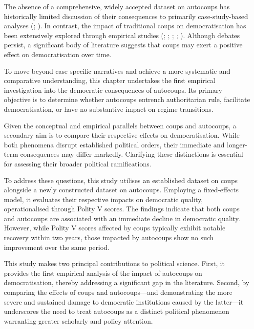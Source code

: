 \documentclass[
  12pt,
]{report}
\begin{document}
The absence of a comprehensive, widely accepted dataset on autocoups has
historically limited discussion of their consequences to primarily
case-study-based analyses (; ). In
contrast, the impact of traditional coups on democratisation has been
extensively explored through empirical studies
(; ; ; ;
). Although debates
persist, a significant body of literature suggests that coups may exert
a positive effect on democratisation over time.

To move beyond case-specific narratives and achieve a more systematic
and comparative understanding, this chapter undertakes the first
empirical investigation into the democratic consequences of autocoups.
Its primary objective is to determine whether autocoups entrench
authoritarian rule, facilitate democratisation, or have no substantive
impact on regime transitions.

Given the conceptual and empirical parallels between coups and
autocoups, a secondary aim is to compare their respective effects on
democratisation. While both phenomena disrupt established political
orders, their immediate and longer-term consequences may differ
markedly. Clarifying these distinctions is essential for assessing their
broader political ramifications.

To address these questions, this study utilises an established dataset
on coups alongside a newly constructed dataset on autocoups. Employing a
fixed-effects model, it evaluates their respective impacts on democratic
quality, operationalised through Polity V scores. The findings indicate
that both coups and autocoups are associated with an immediate decline
in democratic quality. However, while Polity V scores affected by coups
typically exhibit notable recovery within two years, those impacted by
autocoups show no such improvement over the same period.

This study makes two principal contributions to political science.
First, it provides the first empirical analysis of the impact of
autocoups on democratisation, thereby addressing a significant gap in
the literature. Second, by comparing the effects of coups and
autocoups---and demonstrating the more severe and sustained damage to
democratic institutions caused by the latter---it underscores the need
to treat autocoups as a distinct political phenomenon warranting greater
scholarly and policy attention.
\end{document}
